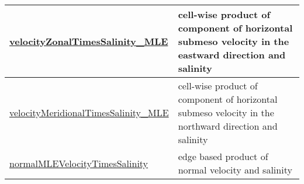 {\begin{center}
\begin{longtable}{| p{2.0in} | p{4.0in} |}
    \hline
    \hyperref[subsec:var_sec_eddyProductVariablesAM_velocityZonalTimesSalinity_MLE]{velocityZonalTimesSalinity\_MLE} & cell-wise product of component of horizontal submeso velocity in the eastward direction and salinity \\
    \hline
    \hyperref[subsec:var_sec_eddyProductVariablesAM_velocityMeridionalTimesSalinity_MLE]{velocityMeridionalTimesSalinity\_\-MLE} & cell-wise product of component of horizontal submeso velocity in the northward direction and salinity \\
    \hline
    \hyperref[subsec:var_sec_eddyProductVariablesAM_normalMLEVelocityTimesSalinity]{normalMLEVelocityTimesSalinity} & edge based product of normal velocity and salinity \\
    \hline
\end{longtable}
\end{center}
}
